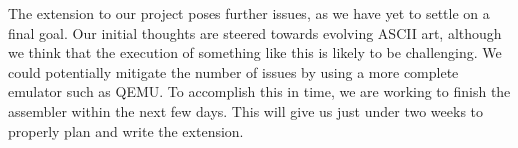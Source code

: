 \documentclass[]{article}
\begin{document}
\vspace{3mm}

The extension to our project poses further issues, as we have yet to settle on a final goal. Our initial thoughts are steered towards evolving ASCII art, although we think that the execution of something like this is likely to be challenging. We could potentially mitigate the number of issues by using a more complete emulator such as QEMU. To accomplish this in time, we are working to finish the assembler within the next few days. This will give us just under two weeks to properly plan and write the extension.
\end{document}
